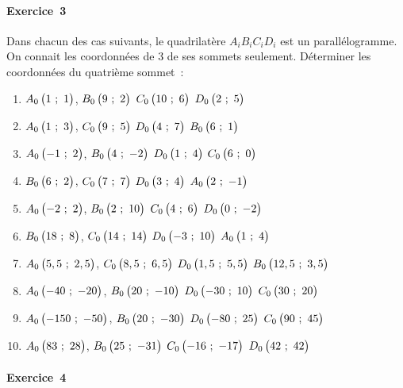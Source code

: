 \documentclass[a4paper,12pt,twocolumn,landscape]{article}
\newcommand{\parallelogrammeManqueA}[8]{$\pointcoord{B_{\theenumi}}{#1}{#2}$, $\pointcoord{C_{\theenumi}}{#3}{#4}$ $\pointcoord{D_{\theenumi}}{#5}{#6}$ \hfill \textcolor{red}{$\pointcoord{A_{\theenumi}}{#7}{#8}$}}
\newcommand{\parallelogrammeManqueB}[8]{$\pointcoord{A_{\theenumi}}{#1}{#2}$, $\pointcoord{C_{\theenumi}}{#3}{#4}$ $\pointcoord{D_{\theenumi}}{#5}{#6}$ \hfill \textcolor{red}{$\pointcoord{B_{\theenumi}}{#7}{#8}$}}
\newcommand{\parallelogrammeManqueC}[8]{$\pointcoord{A_{\theenumi}}{#1}{#2}$, $\pointcoord{B_{\theenumi}}{#3}{#4}$ $\pointcoord{D_{\theenumi}}{#5}{#6}$ \hfill \textcolor{red}{$\pointcoord{C_{\theenumi}}{#7}{#8}$}}
\newcommand{\parallelogrammeManqueD}[8]{$\pointcoord{A_{\theenumi}}{#1}{#2}$, $\pointcoord{B_{\theenumi}}{#3}{#4}$ $\pointcoord{C_{\theenumi}}{#5}{#6}$ \hfill \textcolor{red}{$\pointcoord{D_{\theenumi}}{#7}{#8}$}}
\begin{document}
\newpage
\begin{minipage}{0.45\textwidth}
\thispagestyle{firststyle}

\vspace*{1em}

\paragraph{Exercice~3} Dans chacun des cas suivants, le quadrilatère $A_iB_iC_iD_i$ est un parallélogramme. On connait les coordonnées de 3 de ses sommets seulement. Déterminer les coordonnées du quatrième sommet~:
	\begin{enumerate}
		\item \parallelogrammeManqueD{1}{1}{9}{2}{10}{6}{2}{5}
		\item \parallelogrammeManqueB{1}{3}{9}{5}{4}{7}{6}{1}
		\item \parallelogrammeManqueC{-1}{2}{4}{-2}{1}{4}{6}{0}
		
		\item \parallelogrammeManqueA{6}{2}{7}{7}{3}{4}{2}{-1}
		\item \parallelogrammeManqueD{-2}{2}{2}{10}{4}{6}{0}{-2}
		\item \parallelogrammeManqueA{18}{8}{14}{14}{-3}{10}{1}{4}
		\item \parallelogrammeManqueB{5,5}{2,5}{8,5}{6,5}{1,5}{5,5}{12,5}{3,5}

		\item \parallelogrammeManqueC{-40}{-20}{20}{-10}{-30}{10}{30}{20}
		
		\item \parallelogrammeManqueC{-150}{-50}{20}{-30}{-80}{25}{90}{45}
		
		\item \parallelogrammeManqueD{83}{28}{25}{-31}{-16}{-17}{42}{42}
	\end{enumerate}

\paragraph{Exercice~4} 


\end{minipage}
\end{document}
